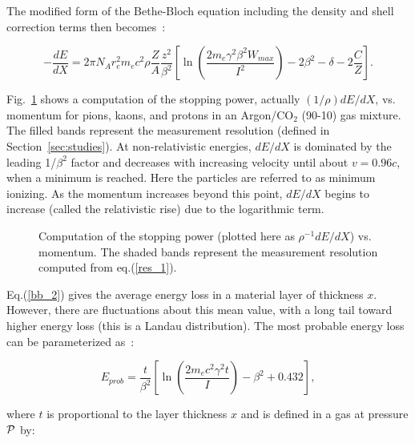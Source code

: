 \documentclass[12pt]{article}
\begin{document}
The modified form of the Bethe-Bloch equation including the density and shell correction terms then becomes~\cite{leo}:

\begin{equation}
\label{bb_2}
-\frac{dE}{dX} = 2 \pi N_A r_e^2 m_e c^2 \rho \frac{Z}{A} \frac{z^2}{\beta^2} \left [\ln \left( \frac{2 m_e \gamma^2 \beta^2 W_{max}}{I^2} \right) - 2 \beta^2 - \delta - 2\frac{C}{Z} \right].
\end{equation}

Fig.~\ref{stop} shows a computation of the stopping power, actually $(1/\rho)dE/dX$, vs. momentum for pions, kaons, and protons in an Argon/CO$_2$ (90-10) gas mixture. The filled bands
represent the measurement resolution (defined in Section~\ref{sec:studies}).  At non-relativistic energies, $dE/dX$ is dominated by the leading 1/$\beta^2$ factor and decreases with
increasing velocity until about $v=0.96c$, when a minimum is reached.  Here the particles are referred to as minimum ionizing.  As the momentum increases beyond this point, $dE/dX$
begins to increase (called the relativistic rise) due to the logarithmic term.

\vfil
\eject

\begin{figure}[htbp]
\vspace{12.5cm}
\caption{\small{Computation of the stopping power (plotted here as $\rho^{-1}dE/dX$) vs. momentum. The shaded bands represent the measurement resolution computed from eq.(\ref{res_1}).}}
\label{stop}
\end{figure}

Eq.(\ref{bb_2}) gives the average energy loss in a material layer of thickness $x$.  However, there are fluctuations about this mean value, with a long tail toward higher energy loss
(this is a Landau distribution).  The most probable energy loss can be parameterized as~\cite{talman}:

\begin{equation}
E_{prob} = \frac{t}{\beta^2} \left[ \ln \left( \frac{2 m_e c^2 \gamma^2 t}{I} \right) - \beta^2 + 0.432 \right],
\end{equation}

\noindent
where $t$ is proportional to the layer thickness $x$ and is defined in a gas at pressure $\cal{P}$ by:
\end{document}
